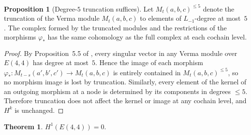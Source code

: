 \documentclass[reqno,10pt]{amsart}
\theoremstyle{definition}
\newtheorem{theor}[subsubsection]{Theorem}
\newtheorem{prop}[subsubsection]{Proposition}
\begin{document}
\begin{prop}[Degree-$5$ truncation suffices]\label{prop:truncation}
Let $M_t(a,b,c)^{\leq 5}$ denote the truncation of the Verma module
$M_t(a,b,c)$ to elements of $L_{-1}$-degree at most~$5$.  The complex
formed by the truncated modules and the restrictions of the morphisms
$\varphi_*$ has the same cohomology as the full complex at each cochain
level.
\end{prop}

\begin{proof}
By Proposition~5.5 of \cite{CCK2026}, every singular vector in any Verma
module over $E(4,4)$ has degree at most~$5$.  Hence the image of each
morphism $\varphi_*: M_{t-s}(a',b',c')\to M_t(a,b,c)$ is entirely
contained in $M_t(a,b,c)^{\leq 5}$, so no morphism image is lost by
truncation.  Similarly, every element of the kernel of an outgoing
morphism at a node is determined by its components in degrees $\leq 5$.
Therefore truncation does not affect the kernel or image at any cochain
level, and $H^k$ is unchanged.
\end{proof}

\begin{theor}\label{thm:h1-vanish}
$H^1(E(4,4)) = 0$.
\end{theor}
\end{document}

